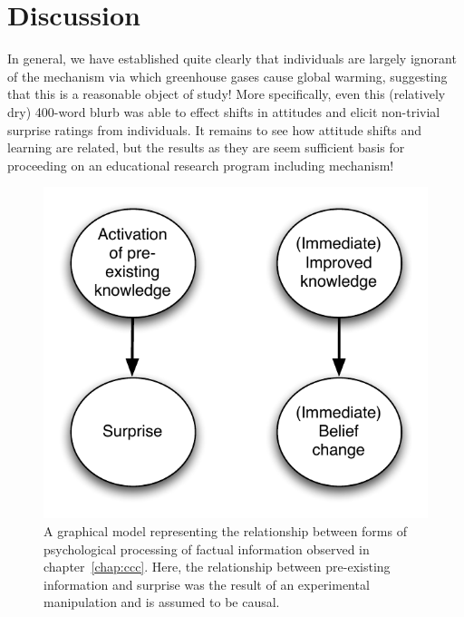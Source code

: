 \section{Discussion}

In general, we have established quite clearly that individuals are largely
ignorant of the mechanism via which greenhouse gases cause global warming,
suggesting that this is a reasonable object of study! More specifically, even
this (relatively dry) 400-word blurb was able to effect shifts in attitudes and
elicit non-trivial surprise ratings from individuals. It remains to see how
attitude shifts and learning are related, but the results as they are seem
sufficient basis for proceeding on an educational research program including
mechanism!



\begin{figure}
\begin{center}
\includegraphics{causal2.pdf}
\end{center}
\caption{A graphical model representing the relationship between forms of
    psychological processing of factual information observed in
    chapter~\ref{chap:ccc}. Here, the relationship between pre-existing
    information and surprise was the result of an experimental manipulation and
    is assumed to be causal.}
\label{fig:causal-ccc}
\end{figure}
